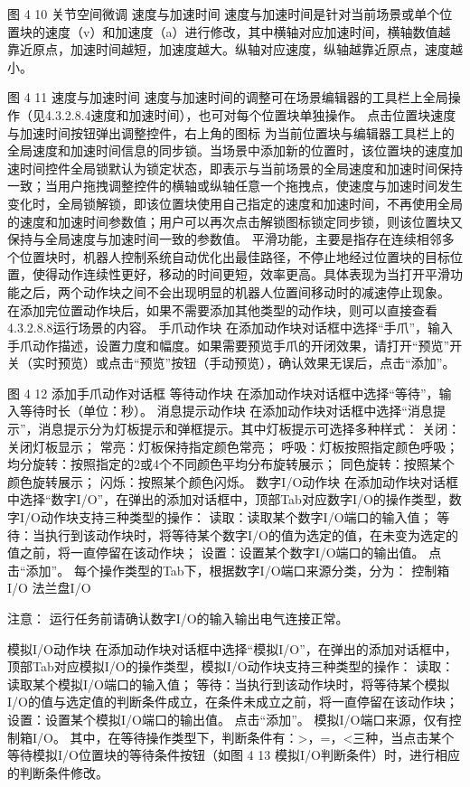 图 4 10 关节空间微调
	速度与加速时间
速度与加速时间是针对当前场景或单个位置块的速度（v）和加速度（a）进行修改，其中横轴对应加速时间，横轴数值越靠近原点，加速时间越短，加速度越大。纵轴对应速度，纵轴越靠近原点，速度越小。


图 4 11  速度与加速时间
速度与加速时间的调整可在场景编辑器的工具栏上全局操作（见4.3.2.8.4速度和加速时间），也可对每个位置块单独操作。
点击位置块速度与加速时间按钮弹出调整控件，右上角的图标   为当前位置块与编辑器工具栏上的全局速度和加速时间信息的同步锁。当场景中添加新的位置时，该位置块的速度加速时间控件全局锁默认为锁定状态，即表示与当前场景的全局速度和加速时间保持一致；当用户拖拽调整控件的横轴或纵轴任意一个拖拽点，使速度与加速时间发生变化时，全局锁解锁，即该位置块使用自己指定的速度和加速时间，不再使用全局的速度和加速时间参数值；用户可以再次点击解锁图标锁定同步锁，则该位置块又保持与全局速度与加速时间一致的参数值。
平滑功能，主要是指存在连续相邻多个位置块时，机器人控制系统自动优化出最佳路径，不停止地经过位置块的目标位置，使得动作连续性更好，移动的时间更短，效率更高。具体表现为当打开平滑功能之后，两个动作块之间不会出现明显的机器人位置间移动时的减速停止现象。
在添加完位置动作块后，如果不需要添加其他类型的动作块，则可以直接查看4.3.2.8.8运行场景的内容。
手爪动作块
在添加动作块对话框中选择“手爪”，输入手爪动作描述，设置力度和幅度。如果需要预览手爪的开闭效果，请打开“预览”开关（实时预览）或点击“预览”按钮（手动预览），确认效果无误后，点击“添加”。


图 4 12  添加手爪动作对话框
等待动作块
在添加动作块对话框中选择“等待”，输入等待时长（单位：秒）。
消息提示动作块
在添加动作块对话框中选择“消息提示”，消息提示分为灯板提示和弹框提示。其中灯板提示可选择多种样式：
关闭：关闭灯板显示；
常亮：灯板保持指定颜色常亮；
呼吸：灯板按照指定颜色呼吸；
均分旋转：按照指定的2或4个不同颜色平均分布旋转展示；
同色旋转：按照某个颜色旋转展示；
闪烁：按照某个颜色闪烁。
数字I/O动作块
在添加动作块对话框中选择“数字I/O”，在弹出的添加对话框中，顶部Tab对应数字I/O的操作类型，数字I/O动作块支持三种类型的操作：
读取：读取某个数字I/O端口的输入值；
等待：当执行到该动作块时，将等待某个数字I/O的值为选定的值，在未变为选定的值之前，将一直停留在该动作块；
设置：设置某个数字I/O端口的输出值。
点击“添加”。
每个操作类型的Tab下，根据数字I/O端口来源分类，分为：
控制箱I/O
法兰盘I/O

 	注意：
运行任务前请确认数字I/O的输入输出电气连接正常。

模拟I/O动作块
在添加动作块对话框中选择“模拟I/O”，在弹出的添加对话框中，顶部Tab对应模拟I/O的操作类型，模拟I/O动作块支持三种类型的操作：
读取：读取某个模拟I/O端口的输入值；
等待：当执行到该动作块时，将等待某个模拟I/O的值与选定值的判断条件成立，在条件未成立之前，将一直停留在该动作块；
设置：设置某个模拟I/O端口的输出值。
点击“添加”。
模拟I/O端口来源，仅有控制箱I/O。
其中，在等待操作类型下，判断条件有：>，=，<三种，当点击某个等待模拟I/O位置块的等待条件按钮（如图 4 13 模拟I/O判断条件）时，进行相应的判断条件修改。

